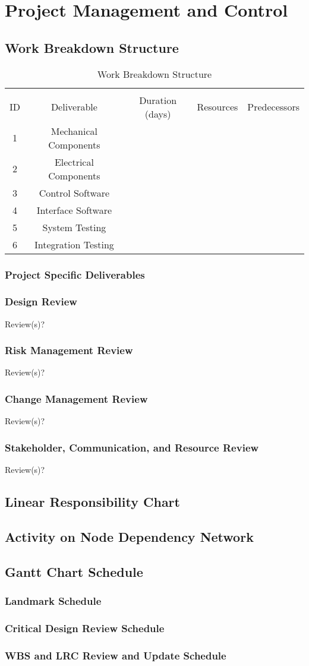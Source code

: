 \chapter{Project Management and Control}
\section{Work Breakdown Structure}
\begin{table}[ht] 
	\caption{Work Breakdown Structure}
	\label{table:primary}
	\centering
	\begin{tabular}{c c c c c} 
		\hline\hline \\
		ID & Deliverable & Duration (days) & Resources & Predecessors \\
		1 & Mechanical Components\\
		2 & Electrical Components \\
		3 & Control Software \\
		4 & Interface Software \\
		5 & System Testing \\
		6 & Integration Testing \\
	\end{tabular} 
\end{table}
\subsection{Project Specific Deliverables}
\subsection{Design Review}
Review(s)?
\subsection{Risk Management Review}
Review(s)?
\subsection{Change Management Review}
Review(s)?
\subsection{Stakeholder, Communication, and Resource Review}
Review(s)?
\section{Linear Responsibility Chart}
\section{Activity on Node Dependency Network}
\section{Gantt Chart Schedule}
\subsection{Landmark Schedule}
\subsection{Critical Design Review Schedule}
\subsection{WBS and LRC Review and Update Schedule}